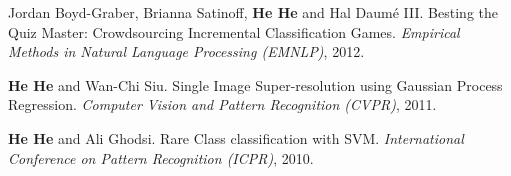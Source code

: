 Jordan Boyd-Graber, Brianna Satinoff, \textbf{He He} and Hal Daum\'e III. Besting the Quiz Master: Crowdsourcing Incremental Classification Games. \textit{Empirical Methods in Natural Language Processing (EMNLP)}, 2012.

\textbf{He He} and Wan-Chi Siu. Single Image Super-resolution using Gaussian Process Regression. \textit{Computer Vision and Pattern Recognition (CVPR)}, 2011.

\textbf{He He} and Ali Ghodsi. Rare Class classification with SVM. \textit{International Conference on Pattern Recognition (ICPR)}, 2010.

